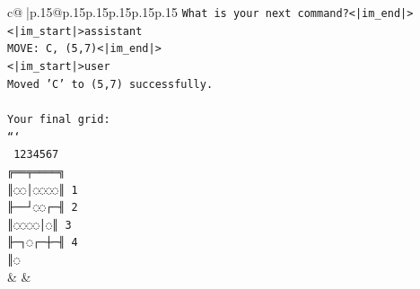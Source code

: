 \documentclass{article}
\begin{document}
{\begin{supertabular}{c@{$\;$}|p{.15\linewidth}@{}p{.15\linewidth}p{.15\linewidth}p{.15\linewidth}p{.15\linewidth}p{.15\linewidth}}
{{{\texttt{What is your next command?<|im\_end|>} \\
\texttt{<|im\_start|>assistant} \\
\texttt{MOVE: C, (5,7)<|im\_end|>} \\
\texttt{<|im\_start|>user} \\
\texttt{Moved 'C' to (5,7) successfully.} \\
\\ 
\texttt{Your final grid:} \\
\texttt{```} \\
\texttt{ 1234567} \\
\texttt{╔══╤════╗} \\
\texttt{║◌◌│◌◌◌◌║ 1} \\
\texttt{╟──┘◌◌┌─╢ 2} \\
\texttt{║◌◌◌◌│◌║ 3} \\
\texttt{╟─┐◌┌─┼─╢ 4} \\
\texttt{║◌} \\
            }
        }
    }
    & & \\ \\


\end{supertabular}}
\end{document}
